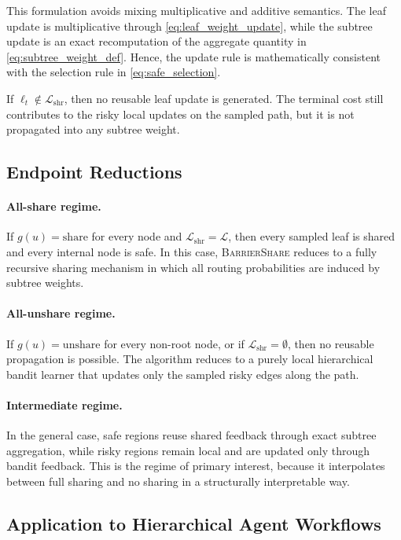 \documentclass{article}
\begin{document}
This formulation avoids mixing multiplicative and additive semantics. The leaf update is multiplicative through \eqref{eq:leaf_weight_update}, while the subtree update is an exact recomputation of the aggregate quantity in \eqref{eq:subtree_weight_def}. Hence, the update rule is mathematically consistent with the selection rule in \eqref{eq:safe_selection}.

If $\ell_t \notin \mathcal{L}_{\mathrm{shr}}$, then no reusable leaf update is generated. The terminal cost still contributes to the risky local updates on the sampled path, but it is not propagated into any subtree weight.

\subsection{Endpoint Reductions}
\label{sec:barriershare_reductions}

\paragraph{All-share regime.}
If $g(u)=\mathrm{share}$ for every node and $\mathcal{L}_{\mathrm{shr}}=\mathcal{L}$, then every sampled leaf is shared and every internal node is safe. In this case, \textsc{BarrierShare} reduces to a fully recursive sharing mechanism in which all routing probabilities are induced by subtree weights.

\paragraph{All-unshare regime.}
If $g(u)=\mathrm{unshare}$ for every non-root node, or if $\mathcal{L}_{\mathrm{shr}}=\emptyset$, then no reusable propagation is possible. The algorithm reduces to a purely local hierarchical bandit learner that updates only the sampled risky edges along the path.

\paragraph{Intermediate regime.}
In the general case, safe regions reuse shared feedback through exact subtree aggregation, while risky regions remain local and are updated only through bandit feedback. This is the regime of primary interest, because it interpolates between full sharing and no sharing in a structurally interpretable way.

\subsection{Application to Hierarchical Agent Workflows}
\label{sec:barriershare_agent_instantiation}
\end{document}
